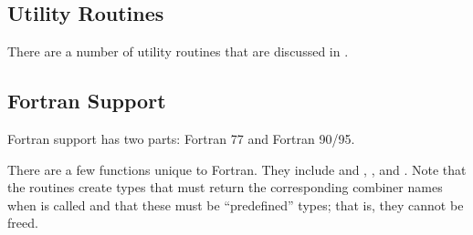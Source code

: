 \documentclass{article}
\begin{document}


\subsection{Utility Routines}
There are a number of utility routines that are discussed in
.

\subsection{Fortran Support}
\label{sec:fortran}
Fortran support has two parts: Fortran 77 and Fortran 90/95.  

There are a few functions unique to Fortran.  They include
 and , 
, and 
.  Note that the 
routines create types that must return the corresponding combiner names when
 is called and that these must be
``predefined'' types; that is, they cannot be freed.
\end{document}
